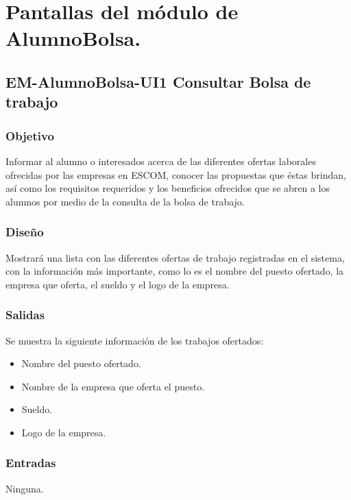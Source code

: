
\section{Pantallas del módulo de AlumnoBolsa.}

\subsection{EM-AlumnoBolsa-UI1 Consultar Bolsa de trabajo}

\subsubsection{Objetivo}
	\noindent
	Informar al alumno o interesados acerca de las diferentes ofertas laborales ofrecidas por las empresas en ESCOM, conocer las propuestas que éstas brindan, así como los requisitos requeridos y los beneficios ofrecidos que se abren a los alumnos por medio de la consulta de la bolsa de trabajo. 

\subsubsection{Diseño}
	\noindent
	Mostrará una lista con las diferentes ofertas de trabajo registradas en el sistema, con la información más importante, como lo es el nombre del puesto ofertado, la empresa que oferta, el sueldo y el logo de la empresa. 

\pagebreak
{}

\subsubsection{Salidas}
	\noindent
	Se muestra la siguiente información de los trabajos ofertados:
	\begin{itemize} 
		\item Nombre del puesto ofertado.
		\item Nombre de la empresa que oferta el puesto.
		\item Sueldo.
		\item Logo de la empresa.
	\end{itemize}

\subsubsection{Entradas}
	\noindent
	Ninguna.

